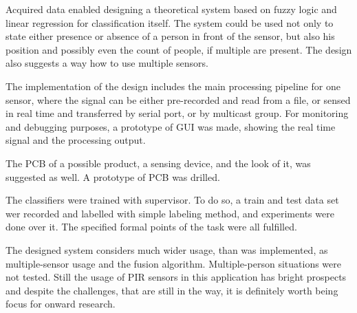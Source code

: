 Acquired data enabled designing a theoretical system based on fuzzy logic and linear regression for classification itself. The system
could be used not only to state either presence or absence of a person in front of the sensor, but also his position and possibly
even the count of people, if multiple are present. The design also suggests a way how to use multiple sensors.

The implementation of the design includes the main processing pipeline for one sensor, where the signal can be either pre-recorded
and read from a file, or sensed in real time and transferred by serial port, or by multicast group. For monitoring and debugging
purposes, a prototype of GUI was made, showing the real time signal and the processing output.

The PCB of a possible product, a sensing device, and the look of it, was suggested as well. A prototype of PCB was drilled.

The classifiers were trained with supervisor. To do so, a train and test data set wer recorded and labelled with simple labeling method,
and experiments were done over it. The specified formal points of the task were all fulfilled.

The designed system considers much wider usage, than was implemented, as multiple-sensor usage and the fusion algorithm. Multiple-person
situations were not tested. Still the usage of PIR sensors in this application has bright prospects and despite the challenges, that
are still in the way, it is definitely worth being focus for onward research.






